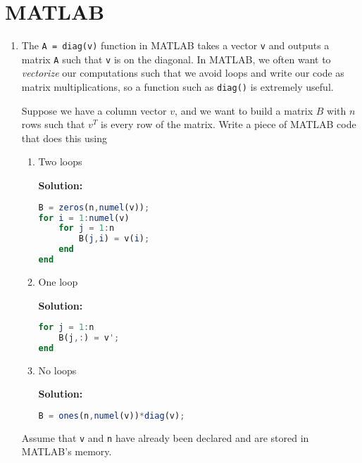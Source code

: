 \documentclass[letterpaper, 11pt]{article}
\begin{document}
\section{MATLAB}
\begin{enumerate}
\item The \texttt{A = diag(v)} function in MATLAB takes a vector \texttt{v} and outputs a matrix \texttt{A} such that \texttt{v} is on the diagonal. In MATLAB, we often want to \textit{vectorize} our computations such that we avoid loops and write our code as matrix multiplications, so a function such as \texttt{diag()} is extremely useful. 
\par Suppose we have a column vector $v$, and we want to build a matrix $B$ with $n$ rows such that $v^T$ is every row of the matrix. Write a piece of MATLAB code that does this using
\begin{enumerate}[label=(\alph*)]
\item Two loops
\par \textbf{Solution:}
\begin{lstlisting}[language=Octave]
B = zeros(n,numel(v));
for i = 1:numel(v)
	for j = 1:n
		B(j,i) = v(i);
	end
end
\end{lstlisting}

\item One loop
\par \textbf{Solution:}
\begin{lstlisting}[language=Octave]
for j = 1:n
	B(j,:) = v';
end
\end{lstlisting}

\item No loops
\par \textbf{Solution:}
\begin{lstlisting}[language=Octave]
B = ones(n,numel(v))*diag(v);
\end{lstlisting}

\end{enumerate}
Assume that \texttt{v} and \texttt{n} have already been declared and are stored in MATLAB's memory.
 

\end{enumerate}
\end{document}
